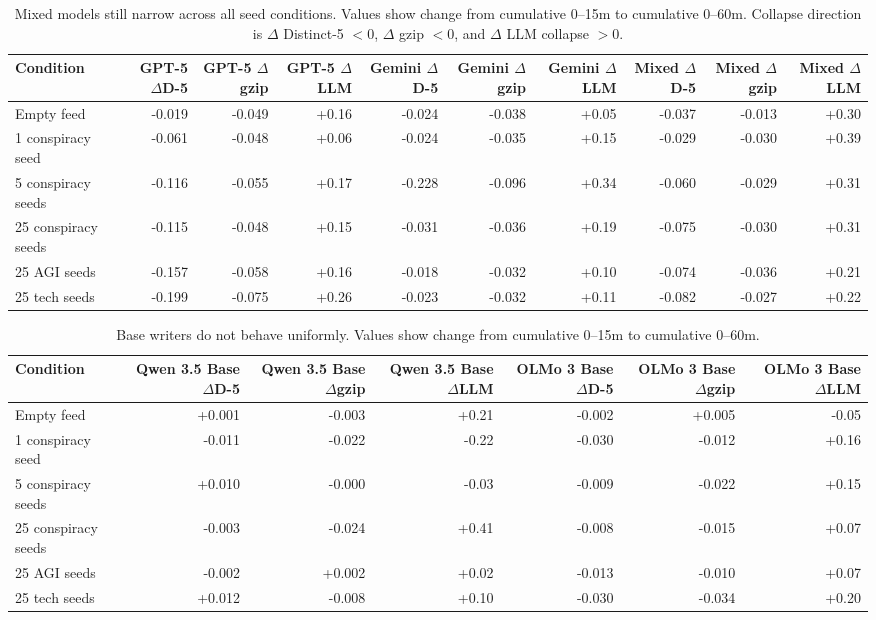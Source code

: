 \begin{table}[t]
\centering
\caption{Mixed models still narrow across all seed conditions. Values show change from cumulative 0--15m to cumulative 0--60m. Collapse direction is $\Delta$ Distinct-5 $<0$, $\Delta$ gzip $<0$, and $\Delta$ LLM collapse $>0$.}
\label{tab:app-mixed-model-deltas}
\scriptsize
\setlength{\tabcolsep}{3pt}
\begin{adjustbox}{max width=\textwidth}
\begin{tabular}{lrrrrrrrrr}
\toprule
Condition & GPT-5 $\Delta$D-5 & GPT-5 $\Delta$gzip & GPT-5 $\Delta$LLM & Gemini $\Delta$D-5 & Gemini $\Delta$gzip & Gemini $\Delta$LLM & Mixed $\Delta$D-5 & Mixed $\Delta$gzip & Mixed $\Delta$LLM \\
\midrule
Empty feed & -0.019 & -0.049 & +0.16 & -0.024 & -0.038 & +0.05 & -0.037 & -0.013 & +0.30 \\
1 conspiracy seed & -0.061 & -0.048 & +0.06 & -0.024 & -0.035 & +0.15 & -0.029 & -0.030 & +0.39 \\
5 conspiracy seeds & -0.116 & -0.055 & +0.17 & -0.228 & -0.096 & +0.34 & -0.060 & -0.029 & +0.31 \\
25 conspiracy seeds & -0.115 & -0.048 & +0.15 & -0.031 & -0.036 & +0.19 & -0.075 & -0.030 & +0.31 \\
25 AGI seeds & -0.157 & -0.058 & +0.16 & -0.018 & -0.032 & +0.10 & -0.074 & -0.036 & +0.21 \\
25 tech seeds & -0.199 & -0.075 & +0.26 & -0.023 & -0.032 & +0.11 & -0.082 & -0.027 & +0.22 \\
\bottomrule
\end{tabular}
\end{adjustbox}
\end{table}

\begin{table}[t]
\centering
\caption{Base writers do not behave uniformly. Values show change from cumulative 0--15m to cumulative 0--60m.}
\label{tab:app-base-writer-deltas}
\scriptsize
\setlength{\tabcolsep}{4pt}
\begin{adjustbox}{max width=\textwidth}
\begin{tabular}{lrrrrrr}
\toprule
Condition & Qwen 3.5 Base $\Delta$D-5 & Qwen 3.5 Base $\Delta$gzip & Qwen 3.5 Base $\Delta$LLM & OLMo 3 Base $\Delta$D-5 & OLMo 3 Base $\Delta$gzip & OLMo 3 Base $\Delta$LLM \\
\midrule
Empty feed & +0.001 & -0.003 & +0.21 & -0.002 & +0.005 & -0.05 \\
1 conspiracy seed & -0.011 & -0.022 & -0.22 & -0.030 & -0.012 & +0.16 \\
5 conspiracy seeds & +0.010 & -0.000 & -0.03 & -0.009 & -0.022 & +0.15 \\
25 conspiracy seeds & -0.003 & -0.024 & +0.41 & -0.008 & -0.015 & +0.07 \\
25 AGI seeds & -0.002 & +0.002 & +0.02 & -0.013 & -0.010 & +0.07 \\
25 tech seeds & +0.012 & -0.008 & +0.10 & -0.030 & -0.034 & +0.20 \\
\bottomrule
\end{tabular}
\end{adjustbox}
\end{table}

